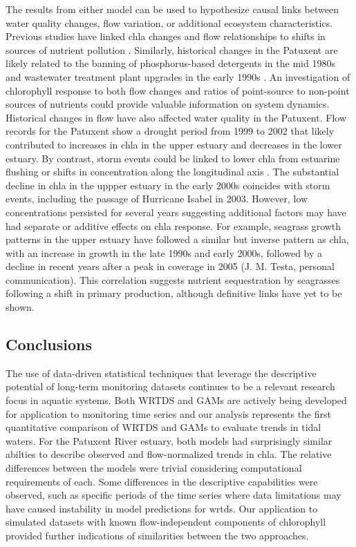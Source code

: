 \documentclass[letterpaper,12pt,oneside]{article}\usepackage[]{graphicx}\usepackage[]{color}
\begin{document}
The results from either model can be used to hypothesize causal links between water quality changes, flow variation, or additional ecosystem characteristics.  Previous studies have linked \ac{chla} changes and flow relationships to shifts in sources of nutrient pollution \citep{Hirsch10,Beck15}.  Similarly, historical changes in the Patuxent are likely related to the banning of phosphorus-based detergents in the mid 1980s and wastewater treatment plant upgrades in the early 1990s \citep{Lung03,Testa08a}.  An investigation of chlorophyll response to both flow changes and ratios of point-source to non-point sources of nutrients could provide valuable information on system dynamics.  Historical changes in flow have also affected water quality in the Patuxent.  Flow records for the Patuxent show a drought period from 1999 to 2002 that likely contributed to increases in \ac{chla} in the upper estuary and decreases in the lower estuary.  By contrast, storm events could be linked to lower \ac{chla} from estuarine flushing or shifts in concentration along the longitudinal axis \citep{Hagy06,Murrell07}.  The substantial decline in \ac{chla} in the uppper estuary in the early 2000s coincides with storm events, including the passage of Hurricane Isabel in 2003.  However, low concentrations persisted for several years suggesting additional factors may have had separate or additive effects on \ac{chla} response.  For example, seagrass growth patterns in the upper estuary have followed a similar but inverse pattern as \ac{chla}, with an increase in growth in the late 1990s and early 2000s, followed by a decline in recent years after a peak in coverage in 2005 (J. M. Testa, personal communication).  This correlation suggests nutrient sequestration by seagrasses following a shift in primary production, although definitive links have yet to be shown.       

\subsection{Conclusions}

The use of data-driven statistical techniques that leverage the descriptive potential of long-term monitoring datasets continues to be a relevant research focus in aquatic systems.  Both \ac{WRTDS} and \acp{GAM} are actively being developed for application to monitoring time series and our analysis represents the first quantitative comparison of \ac{WRTDS} and \acp{GAM} to evaluate trends in tidal waters.  For the Patuxent River estuary, both models had surprisingly similar abilties to describe observed and flow-normalized trends in \ac{chla}.  The relative differences between the models were trivial considering computational requirements of each.  Some differences in the descriptive capabilities were observed, such as specific periods of the time series where data limitations may have caused instability in model predictions for \ac{wrtds}.  Our application to simulated datasets with known flow-independent components of chlorophyll provided further indications of similarities between the two approaches.  
\end{document}
